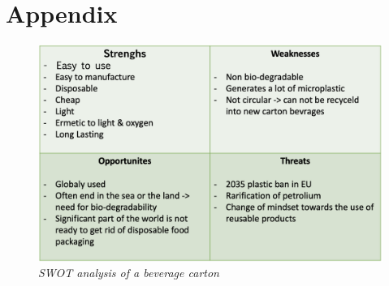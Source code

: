 \section{Appendix}

\begin{figure}[h]
    \centering
    \includegraphics[width=0.9\linewidth]{Appendix/SWOT.png}
    \caption{\textit{SWOT analysis of a beverage carton}}
    \label{1}
\end{figure}